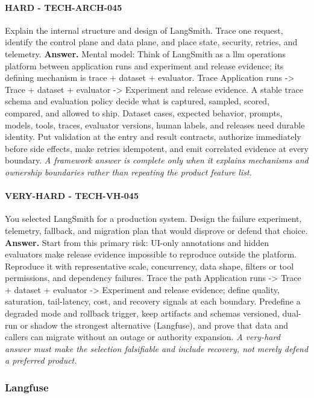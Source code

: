 \paragraph{HARD - TECH-ARCH-045} Explain the internal structure and design of LangSmith. Trace one request, identify the control plane and data plane, and place state, security, retries, and telemetry.
\textbf{Answer.} Mental model: Think of LangSmith as a llm operations platform between application runs and experiment and release evidence; its defining mechanism is trace + dataset + evaluator. Trace Application runs -> Trace + dataset + evaluator -> Experiment and release evidence. A stable trace schema and evaluation policy decide what is captured, sampled, scored, compared, and allowed to ship. Dataset cases, expected behavior, prompts, models, tools, traces, evaluator versions, human labels, and releases need durable identity. Put validation at the entry and result contracts, authorize immediately before side effects, make retries idempotent, and emit correlated evidence at every boundary.
\textit{A framework answer is complete only when it explains mechanisms and ownership boundaries rather than repeating the product feature list.}
\paragraph{VERY-HARD - TECH-VH-045} You selected LangSmith for a production system. Design the failure experiment, telemetry, fallback, and migration plan that would disprove or defend that choice.
\textbf{Answer.} Start from this primary risk: UI-only annotations and hidden evaluators make release evidence impossible to reproduce outside the platform. Reproduce it with representative scale, concurrency, data shape, filters or tool permissions, and dependency failures. Trace the path Application runs -> Trace + dataset + evaluator -> Experiment and release evidence; define quality, saturation, tail-latency, cost, and recovery signals at each boundary. Predefine a degraded mode and rollback trigger, keep artifacts and schemas versioned, dual-run or shadow the strongest alternative (Langfuse), and prove that data and callers can migrate without an outage or authority expansion.
\textit{A very-hard answer must make the selection falsifiable and include recovery, not merely defend a preferred product.}
\subsubsection*{Langfuse}
